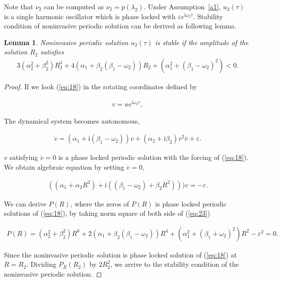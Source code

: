 \documentclass[openacc]{rsproca_new}%
\def\epsilon{\varepsilon}
\newcommand{\Eref}[1]{(\ref{#1})}
\newcommand{\asref}[1]{Assumption~\ref{#1}}
\newtheorem{lemma}{\bf Lemma}[section]
\begin{document}
\noindent Note that $\nu_2$ can be computed as $\nu_2=p(\lambda_2)$. Under \asref{a1}, $u_2(\tau)$ is a single harmonic oscillator which is phase locked with $\epsilon e^{\textrm{i}\omega_2\tau}$. Stability condition of noninvasive periodic solution can be derived as following lemma.

\begin{lemma}\label{t1}
Noninvasive periodic solution $u_2(\tau)$ is stable if the amplitude of the solution $R_2$ satisfies
\begin{align}\label{eq:20}
3(\alpha_2^2+\beta_2^2)R_2^3+4(\alpha_1+\beta_2(\beta_1-\omega_2))R_2+(\alpha_1^2+(\beta_1-\omega_2)^2)<0.
\end{align}
\end{lemma}

\begin{proof}
If we look \Eref{eq:18} in the rotating coordinates defined by

\begin{align}\label{eq:21}
  v=ue^{\textrm{i}\omega_2 \tau},
\end{align}

\noindent The dynamical system becomes autonomous,

\begin{align}\label{eq:22}
  \dot v=(\alpha_1+\textrm{i}(\beta_1-\omega_2))v+(\alpha_2+\textrm{i}\beta_2)v^2\bar{v}+\epsilon.
\end{align}

\noindent $v$ satisfying $\dot v=0$ is a phase locked periodic solution with the forcing of \Eref{eq:18}. We obtain algebraic equation by setting $\dot v=0$,

\begin{align}\label{eq:23}
  ((\alpha_1+\alpha_2R^2)+\textrm{i}((\beta_1-\omega_2)+\beta_2 R^2)))v=-\epsilon.
\end{align}

\noindent We can derive $P(R)$, where the zeros of $P(R)$ is phase locked periodic solutions of \Eref{eq:18}, by taking norm square of both side of \Eref{eq:23}

\begin{align}\label{eq:24}
  P(R)=(\alpha_2^2+\beta_2^2)R^6+2(\alpha_1+\beta_2(\beta_1-\omega_2))R^4+(\alpha_1^2+(\beta_1+\omega_2)^2)R^2-\epsilon^2=0.
\end{align}

\noindent Since the noninvasive periodic solution is phase locked solution of \Eref{eq:18} at $R=R_2$. Dividing $P_R(R_2)$ by $2R_2^2$, we arrive to the stability condition of the noninvasive periodic solution.
\end{proof}
\end{document}
